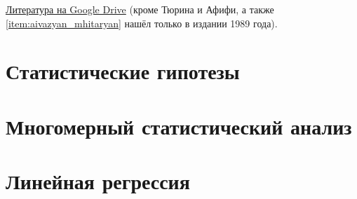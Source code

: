 \documentclass[a4paper,12pt]{report}
\begin{document}
    \href{https://drive.google.com/drive/folders/18WM37ML5G8PERAv0esU2HV9sqEgyejj0?usp=sharing}{Литература на Google Drive} (кроме Тюрина и Афифи, а также \ref{item:aivazyan_mhitaryan} нашёл только в издании 1989 года).

    \chapter{Статистические гипотезы}
    
    

    \chapter{Многомерный статистический анализ}
    

    \chapter{Линейная регрессия}
    
    
    

    
    
    
\end{document}
